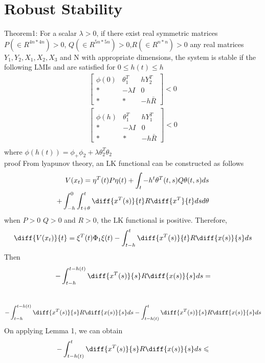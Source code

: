 \documentclass[journal]{IEEEtran}
\begin{document}
\section{Robust Stability}
Theorem1: For a scalar $\lambda > 0$, if there exist real symmetric matrices $P (\in R^{4n*4n}) > 0$, $Q (\in R^{5n*5n}) > 0$,$R (\in R^{n*n}) > 0$ any real matrices $Y_1,Y_2,X_1,X_2,X_3$ and N with appropriate dimensions, the system is stable if the following LMIs and are satisfied for $0 \leqslant h(t) \leqslant h $
  \begin{align}
  \begin{bmatrix}
     \phi(0)&\theta _1^T&hY_2^T\\
     *&-\lambda I&0\\
     *& * & -h\bar{R}
   \end{bmatrix} < 0 \\
  \begin{bmatrix} \\
     \phi(h)&\theta _1^T&hY_1^T\\
     *&-\lambda I&0\\
     *& * & -h\bar{R}
   \end{bmatrix} < 0 \\
 \end{align}
where $\phi(h(t))=\phi _+ \phi _2 + \lambda \theta _2^T \theta _2$   
\\
proof
From lyapunov theory, an LK functional can be constructed as follows
\begin{align}
  V(x_t) = \eta ^T (t)P \eta(t) + \int _t-h^t \theta ^T(t,s)Q\theta(t,s)ds  \\ +\int _{-h} ^0 \int _{t+\theta}^t\diff{x^T(s)}{t}R\diff{x^T}{t}dsd\theta
\end{align}
when $P>0$ $Q> 0$ and $R>0$, the LK functional is positive. 
Therefore,
\begin{equation}
  \diff{V(x_t)}{t}= \xi ^T (t)\Phi _1 \xi (t) - \int _{t-h}^t \diff{x^T(s)}{t}R\diff{x(s)}{s} ds
\end{equation}
Then 
 \begin{equation}
   - \int ^{t-h(t)}_{t-h}\diff{x^T(s)}{s}R\diff{x(s)}{s}ds =
\end{equation}
\\
\begin{equation}
 -\int^{t-h(t)}_{t-h}\diff{x^T(s)}{s}R\diff{x(s)}{s}ds   -\int^{t}_{t-h(t)}\diff{x^T(s)}{s}R\diff{x(s)}{s}ds
 \end{equation}
On applying Lemma 1, we can obtain 
\begin{equation}
 -\int^{t}_{t-h(t)}\diff{x^T(s)}{s}R\diff{x(s)}{s}ds \leqslant 
\end{equation}
\end{document}
